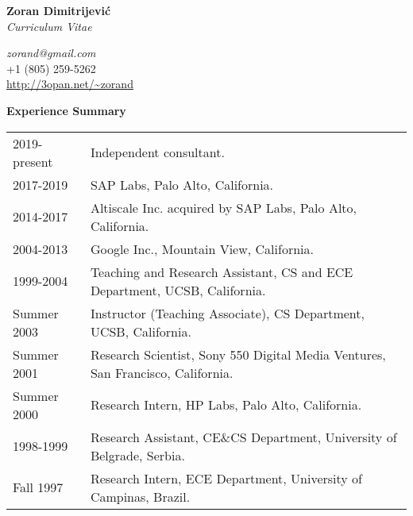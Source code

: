 \documentclass[10pt]{article}
\renewcommand{\section}[1]{ \vspace{10pt}\begin{flushleft}{\hspace{-0.2in }\Large\bf
    #1}\end{flushleft}\nopagebreak }
\begin{document}
\begin{center}
\vspace{-1.5in}
  {\Large\bf Zoran Dimitrijević}\\
  {\large\em Curriculum Vitae}
\end{center}

\begin{center}
{\em zorand@gmail.com}\\
+1 (805) 259-5262\\
\url{http://3opan.net/~zorand}
\end{center}

%

\vspace{-5pt}
\section{Experience Summary}

\begin{tabular}{ll}
2019-present    & Independent consultant.\\
2017-2019       & SAP Labs, Palo Alto, California.\\
2014-2017       & Altiscale Inc. acquired by SAP Labs, Palo Alto, California.\\
2004-2013       & Google Inc., Mountain View, California.\\
1999-2004	& Teaching and Research Assistant, 
			CS and ECE Department, UCSB, California. \\
Summer 2003	& Instructor (Teaching Associate), CS Department, UCSB, California. \\
Summer 2001	& Research Scientist, Sony 550 Digital Media Ventures, 
			San Francisco, California. \\
Summer 2000	& Research Intern, HP Labs, Palo Alto, California. \\
1998-1999	& Research Assistant, CE\&CS Department, University of Belgrade, Serbia.\\
Fall 1997	& Research Intern, ECE Department, University of Campinas, Brazil. \\
\end{tabular}
\end{document}
